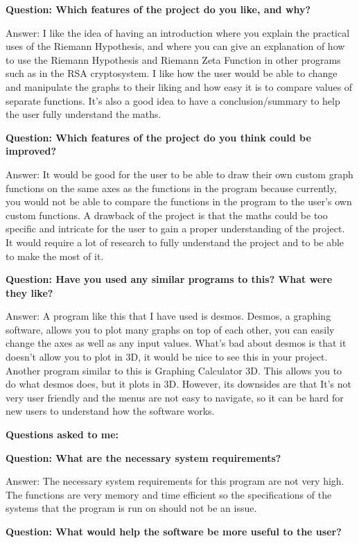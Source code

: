 \documentclass[12pt]{article}
\begin{document}
\textbf{Question: Which features of the project do you like, and why?}

Answer: I like the idea of having an introduction where you explain the practical uses of the Riemann Hypothesis, and where you can give an explanation of how to use the Riemann Hypothesis and Riemann Zeta Function in other programs such as in the RSA cryptosystem. I like how the user would be able to change and manipulate the graphs to their liking and how easy it is to compare values of separate functions. It’s also a good idea to have a  conclusion/summary to help the user fully understand the maths.

\textbf{Question: Which features of the project do you think could be improved?}

Answer: It would be good for the user to be able to draw their own custom graph functions on the same axes as the functions in the program because currently, you would not be able to compare the functions in the program to the user’s own custom functions. A drawback of the project is that the maths could be too specific and intricate for the user to gain a proper understanding of the project. It would require a lot of research to fully understand the project and to be able to make the most of it.

\textbf{Question: Have you used any similar programs to this? What were they like?}

Answer: A program like this that I have used is desmos. Desmos, a graphing software, allows you to plot many graphs on top of each other, you can easily change the axes as well as any input values. What’s bad about desmos is that it doesn’t allow you to plot in 3D, it would be nice to see this in your project. Another program similar to this is Graphing Calculator 3D.
This allows you to do what desmos does, but it plots in 3D. However, its downsides are that It’s not very user friendly and the menus are not easy to navigate, so it can be hard for new users to understand how the software works.

\textbf{Questions asked to me:}

\textbf{Question: What are the necessary system requirements?}

Answer: The necessary system requirements for this program are not very high. The functions are very memory and time efficient so the specifications of the systems that the program is run on should not be an issue.

\textbf{Question: What would help the software be more useful to the user?}
\end{document}
